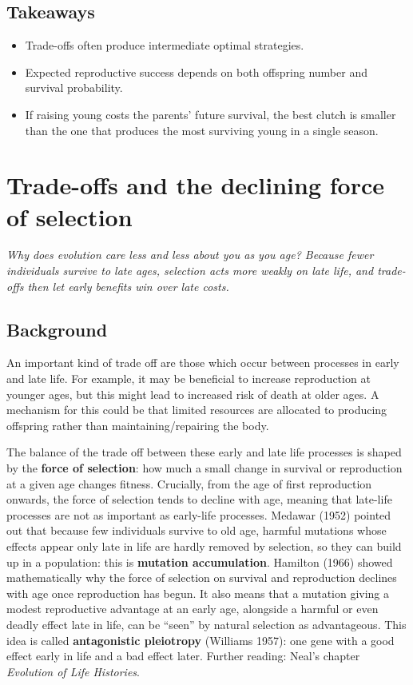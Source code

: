 \documentclass[
  a4paper]{book}
\providecommand{\tightlist}{%
  \setlength{\itemsep}{0pt}\setlength{\parskip}{0pt}}
\begin{document}
\section{Takeaways}\label{takeaways-11}

\begin{itemize}
\tightlist
\item
  Trade-offs often produce intermediate optimal strategies.
\item
  Expected reproductive success depends on both offspring number and survival probability.
\item
  If raising young costs the parents' future survival, the best clutch is smaller than the one that produces the most surviving young in a single season.
\end{itemize}

\chapter{Trade-offs and the declining force of selection}\label{trade-offs-and-the-declining-force-of-selection}

\emph{Why does evolution care less and less about you as you age? Because fewer individuals survive to late ages, selection acts more weakly on late life, and trade-offs then let early benefits win over late costs.}

\section{Background}\label{background-12}

An important kind of trade off are those which occur between processes in early and late life. For example, it may be beneficial to increase reproduction at younger ages, but this might lead to increased risk of death at older ages. A mechanism for this could be that limited resources are allocated to producing offspring rather than maintaining/repairing the body.

The balance of the trade off between these early and late life processes is shaped by the \textbf{force of selection}: how much a small change in survival or reproduction at a given age changes fitness. Crucially, from the age of first reproduction onwards, the force of selection tends to decline with age, meaning that late-life processes are not as important as early-life processes. Medawar (1952) pointed out that because few individuals survive to old age, harmful mutations whose effects appear only late in life are hardly removed by selection, so they can build up in a population: this is \textbf{mutation accumulation}. Hamilton (1966) showed mathematically why the force of selection on survival and reproduction declines with age once reproduction has begun. It also means that a mutation giving a modest reproductive advantage at an early age, alongside a harmful or even deadly effect late in life, can be ``seen'' by natural selection as advantageous. This idea is called \textbf{antagonistic pleiotropy} (Williams 1957): one gene with a good effect early in life and a bad effect later. Further reading: Neal's chapter \emph{Evolution of Life Histories}.
\end{document}
